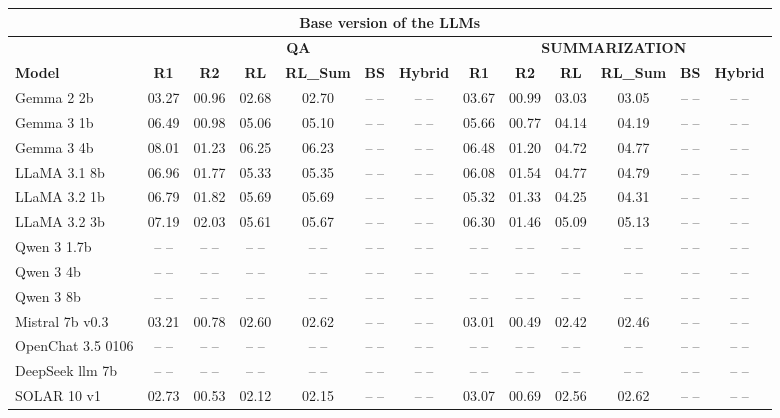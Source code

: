 \begin{table}[ht]
\centering
\scriptsize
\begin{tabular}{lcccccc|cccccc}

\toprule
\multicolumn{13}{c}{\textbf{Base version of the LLMs}}  \\

\midrule
 & \multicolumn{6}{c|}{\textbf{QA}} & \multicolumn{6}{c}{\textbf{SUMMARIZATION}} \\
\midrule

\textbf{Model} & \textbf{R1} & \textbf{R2} & \textbf{RL} & \textbf{RL\_Sum} & \textbf{BS} & \textbf{Hybrid} & \textbf{R1} & \textbf{R2} & \textbf{RL} & \textbf{RL\_Sum} & \textbf{BS} & \textbf{Hybrid} \\
\midrule

Gemma 2 2b & 03.27 & 00.96 & 02.68 & 02.70 & -- -- & -- -- & 03.67 & 00.99 & 03.03 & 03.05 & -- -- & -- -- \\
Gemma 3 1b & 06.49 & 00.98 & 05.06 & 05.10 & -- -- & -- -- & 05.66 & 00.77 & 04.14 & 04.19 & -- -- & -- -- \\
Gemma 3 4b & 08.01 & 01.23 & 06.25 & 06.23 & -- -- & -- -- & 06.48 & 01.20 & 04.72 & 04.77 & -- -- & -- -- \\
LLaMA 3.1 8b & 06.96 & 01.77 & 05.33 & 05.35 & -- -- & -- -- & 06.08 & 01.54 & 04.77 & 04.79 & -- -- & -- -- \\
LLaMA 3.2 1b & 06.79 & 01.82 & 05.69 & 05.69 & -- -- & -- -- & 05.32 & 01.33 & 04.25 & 04.31 & -- -- & -- -- \\
LLaMA 3.2 3b & 07.19 & 02.03 & 05.61 & 05.67 & -- -- & -- -- & 06.30 & 01.46 & 05.09 & 05.13 & -- -- & -- -- \\
Qwen 3 1.7b & -- -- & -- -- & -- -- & -- -- & -- -- & -- -- & -- -- & -- -- & -- -- & -- -- & -- -- & -- -- \\
Qwen 3 4b & -- -- & -- -- & -- -- & -- -- & -- -- & -- -- & -- -- & -- -- & -- -- & -- -- & -- -- & -- -- \\
Qwen 3 8b & -- -- & -- -- & -- -- & -- -- & -- -- & -- -- & -- -- & -- -- & -- -- & -- -- & -- -- & -- -- \\
Mistral 7b v0.3 & 03.21 & 00.78 & 02.60 & 02.62 & -- -- & -- -- & 03.01 & 00.49 & 02.42 & 02.46 & -- -- & -- -- \\
OpenChat 3.5 0106 & -- -- & -- -- & -- -- & -- -- & -- -- & -- -- & -- -- & -- -- & -- -- & -- -- & -- -- & -- -- \\
DeepSeek llm 7b & -- -- & -- -- & -- -- & -- -- & -- -- & -- -- & -- -- & -- -- & -- -- & -- -- & -- -- & -- -- \\
SOLAR 10 v1 & 02.73 & 00.53 & 02.12 & 02.15 & -- -- & -- -- & 03.07 & 00.69 & 02.56 & 02.62 & -- -- & -- -- \\


\end{tabular}
\end{table}
